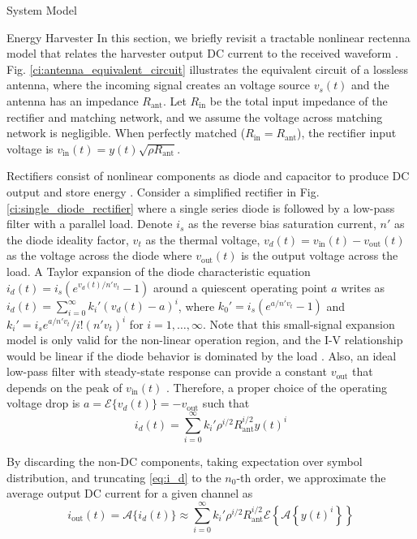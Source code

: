 \documentclass[journal]{IEEEtran}
\begin{document}
\begin{section}{System Model}
\begin{subsection}{Energy Harvester}
			In this section, we briefly revisit a tractable nonlinear rectenna model that relates the harvester output DC current to the received waveform \cite{Clerckx2016a,Clerckx2018b}. Fig. \ref{ci:antenna_equivalent_circuit} illustrates the equivalent circuit of a lossless antenna, where the incoming signal creates an voltage source $v_s(t)$ and the antenna has an impedance $R_{\text{ant}}$. Let $R_{\text{in}}$ be the total input impedance of the rectifier and matching network, and we assume the voltage across matching network is negligible. When perfectly matched ($R_{\text{in}}=R_{\text{ant}}$), the rectifier input voltage is $v_{\text{in}}(t)=y(t)\sqrt{\rho R_{\text{ant}}}$.

			Rectifiers consist of nonlinear components as diode and capacitor to produce DC output and store energy \cite{Hagerty2004,Pinuela2013}. Consider a simplified rectifier in Fig. \ref{ci:single_diode_rectifier} where a single series diode is followed by a low-pass filter with a parallel load. Denote $i_s$ as the reverse bias saturation current, $n'$ as the diode ideality factor, $v_t$ as the thermal voltage, $v_d(t)=v_{\text{in}}(t)-v_{\text{out}}(t)$ as the voltage across the diode where $v_{\text{out}}(t)$ is the output voltage across the load. A Taylor expansion of the diode characteristic equation $i_d(t)=i_s(e^{v_d(t)/n' v_t}-1)$ around a quiescent operating point $a$ writes as $i_d(t)=\sum_{i=0}^{\infty}k_i'(v_d(t)-a)^i$, where $k_0'=i_s(e^{a/n' v_t}-1)$ and $k_i'=i_se^{a/n'v_t}/i!(n'v_t)^i$ for $i=1,\dots,\infty$. Note that this small-signal expansion model is only valid for the non-linear operation region, and the I-V relationship would be linear if the diode behavior is dominated by the load \cite{Clerckx2016a}. Also, an ideal low-pass filter with steady-state response can provide a constant $v_{\text{out}}$ that depends on the peak of $v_{\text{in}}(t)$ \cite{Curty2005}. Therefore, a proper choice of the operating voltage drop is $a=\mathcal{E}\{v_d(t)\}=-v_{\text{out}}$ such that
			\begin{equation}\label{eq:i_d}
				i_d(t)=\sum_{i=0}^{\infty}k_i'\rho^{i/2}R_{\text{ant}}^{i/2}y(t)^i
			\end{equation}

			By discarding the non-DC components, taking expectation over symbol distribution, and truncating \ref{eq:i_d} to the $n_0$-th order, we approximate the average output DC current for a given channel as
			\begin{equation}\label{eq:i_out}
				i_{\text{out}}(t)=\mathcal{A}\{i_d(t)\}\approx\sum_{i=0}^{\infty}{k_i'}{\rho^{i/2}}{R_{\text{ant}}^{i/2}}\mathcal{E}\left\{{\mathcal{A}\left\{y(t)^i\right\}}\right\}
			\end{equation}


\end{subsection}
\end{section}
\end{document}
